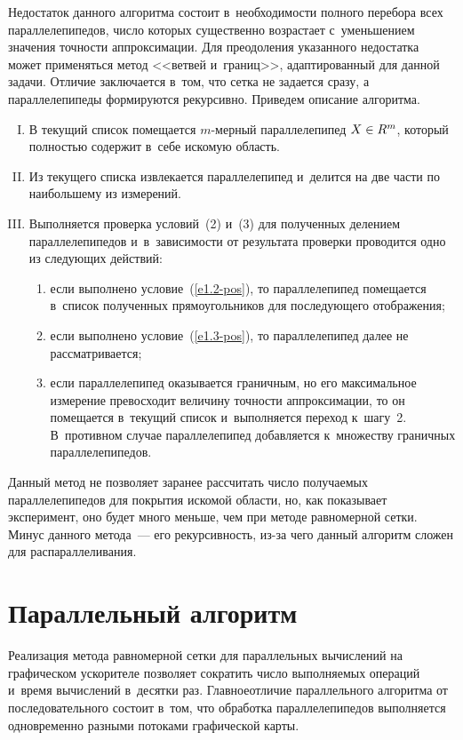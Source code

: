 \begin{multicols}{2}
     Недостаток данного алгоритма состоит в~необходимости полного 
перебора всех параллелепипедов, число которых существенно возрастает 
с~уменьшением значения точности аппроксимации. Для преодоления 
указанного недостатка может применяться метод <<ветвей и~границ>>, 
адаптированный для данной задачи. Отличие заключается в~том, что сетка не 
задается сразу, а параллелепипеды формируются рекурсивно. Приведем 
описание алгоритма.
     \begin{enumerate}[I.]
\item В текущий список помещается $m$-мерный параллелепипед $X\hm\in 
R^m$, который полностью содержит в~себе искомую область.
\item Из текущего списка извлекается параллелепипед и~делится на две части 
по наибольшему из измерений.
\item Выполняется проверка условий~(2) и~(3) для полученных делением 
параллелепипедов и~в~за\-ви\-си\-мости от результата проверки проводится одно 
из следующих действий:
\begin{enumerate}[(1)]
\item если выполнено условие~(\ref{e1.2-pos}), то параллелепипед 
помещается в~список полученных прямоугольников для последующего 
отоб\-ра\-же\-ния;
 \item если выполнено условие~(\ref{e1.3-pos}), то параллелепипед 
далее не рассматривается;
\item если параллелепипед оказывается граничным, но его максимальное 
измерение превосходит величину точности аппрокси\-мации, то он помещается 
в~текущий список и~выполняется переход к~шагу~2. В~противном случае 
параллелепипед добавляется к~множеству граничных параллелепипедов.
 \end{enumerate}
 \end{enumerate}
     
     Данный метод не позволяет заранее рассчитать число получаемых 
параллелепипедов для покрытия искомой области, но, как показывает 
эксперимент, оно будет много меньше, чем при методе равномерной сетки. 
Минус данного метода~--- его рекурсивность, из-за чего данный алгоритм 
сложен для распараллеливания. 

\section{Параллельный алгоритм}

     Реализация метода равномерной сетки для параллельных вычислений на 
графическом ускорителе позволяет сократить число выполняемых операций 
и~время вычислений в~десятки раз. Главное\linebreak отличие параллельного алгоритма 
от последовательного состоит в~том, что обработка параллелепипедов 
выполняется одновременно разными потоками графической карты. 
     

\end{multicols}
